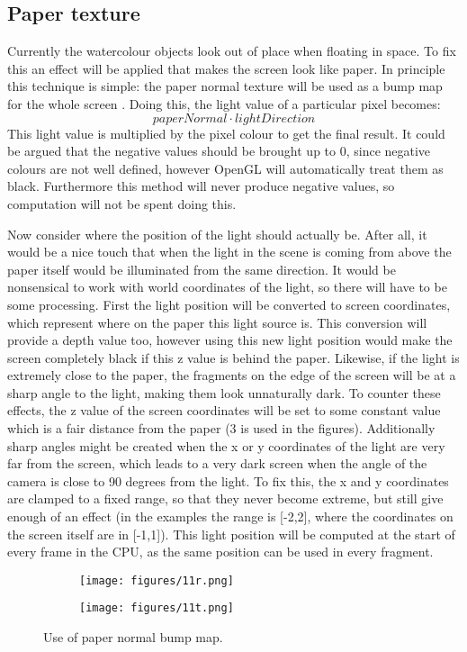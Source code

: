\documentclass[a4paper, 12pt]{article}
\begin{document}
\subsection{Paper texture}
Currently the watercolour objects look out of place when floating in space. To fix this an effect will be applied that makes the screen look like paper. In principle this technique is simple: the paper normal texture will be used as a bump map for the whole screen \cite{Hoare2012}. Doing this, the light value of a particular pixel becomes:
$$\mathit{paperNormal} \cdot \mathit{lightDirection}$$
This light value is multiplied by the pixel colour to get the final result. It could be argued that the negative values should be brought up to 0, since negative colours are not well defined, however OpenGL will automatically treat them as black. Furthermore this method will never produce negative values, so computation will not be spent doing this.

Now consider where the position of the light should actually be. After all, it would be a nice touch that when the light in the scene is coming from above the paper itself would be illuminated from the same direction. It would be nonsensical to work with world coordinates of the light, so there will have to be some processing. First the light position will be converted to screen coordinates, which represent where on the paper this light source is. This conversion will provide a depth value too, however using this new light position would make the screen completely black if this z value is behind the paper. Likewise, if the light is extremely close to the paper, the fragments on the edge of the screen will be at a sharp angle to the light, making them look unnaturally dark. To counter these effects, the z value of the screen coordinates will be set to some constant value which is a fair distance from the paper (3 is used in the figures). Additionally sharp angles might be created when the x or y coordinates of the light are very far from the screen, which leads to a very dark screen when the angle of the camera is close to 90 degrees from the light. To fix this, the x and y coordinates are clamped to a fixed range, so that they never become extreme, but still give enough of an effect (in the examples the range is [-2,2], where the coordinates on the screen itself are in [-1,1]). This light position will be computed at the start of every frame in the CPU, as the same position can be used in every fragment.

\begin{figure}[htbp!]
  \centering
  \begin{subfigure}{0.5\columnwidth}
    \texttt{[image: figures/11r.png]}
  \end{subfigure}
  \begin{subfigure}{0.3\columnwidth}
    \texttt{[image: figures/11t.png]}
  \end{subfigure}  \caption{Use of paper normal bump map.}
\end{figure}
\end{document}
